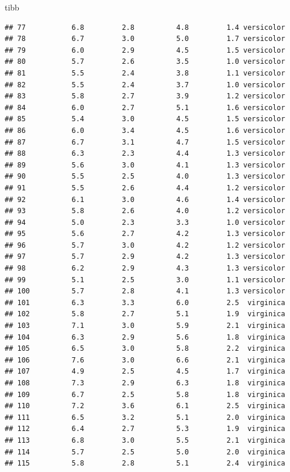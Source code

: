 \documentclass[ignorenonframetext,]{beamer}
\begin{document}
\begin{frame}[fragile]{tibb}
\begin{verbatim}
## 77           6.8         2.8          4.8         1.4 versicolor
## 78           6.7         3.0          5.0         1.7 versicolor
## 79           6.0         2.9          4.5         1.5 versicolor
## 80           5.7         2.6          3.5         1.0 versicolor
## 81           5.5         2.4          3.8         1.1 versicolor
## 82           5.5         2.4          3.7         1.0 versicolor
## 83           5.8         2.7          3.9         1.2 versicolor
## 84           6.0         2.7          5.1         1.6 versicolor
## 85           5.4         3.0          4.5         1.5 versicolor
## 86           6.0         3.4          4.5         1.6 versicolor
## 87           6.7         3.1          4.7         1.5 versicolor
## 88           6.3         2.3          4.4         1.3 versicolor
## 89           5.6         3.0          4.1         1.3 versicolor
## 90           5.5         2.5          4.0         1.3 versicolor
## 91           5.5         2.6          4.4         1.2 versicolor
## 92           6.1         3.0          4.6         1.4 versicolor
## 93           5.8         2.6          4.0         1.2 versicolor
## 94           5.0         2.3          3.3         1.0 versicolor
## 95           5.6         2.7          4.2         1.3 versicolor
## 96           5.7         3.0          4.2         1.2 versicolor
## 97           5.7         2.9          4.2         1.3 versicolor
## 98           6.2         2.9          4.3         1.3 versicolor
## 99           5.1         2.5          3.0         1.1 versicolor
## 100          5.7         2.8          4.1         1.3 versicolor
## 101          6.3         3.3          6.0         2.5  virginica
## 102          5.8         2.7          5.1         1.9  virginica
## 103          7.1         3.0          5.9         2.1  virginica
## 104          6.3         2.9          5.6         1.8  virginica
## 105          6.5         3.0          5.8         2.2  virginica
## 106          7.6         3.0          6.6         2.1  virginica
## 107          4.9         2.5          4.5         1.7  virginica
## 108          7.3         2.9          6.3         1.8  virginica
## 109          6.7         2.5          5.8         1.8  virginica
## 110          7.2         3.6          6.1         2.5  virginica
## 111          6.5         3.2          5.1         2.0  virginica
## 112          6.4         2.7          5.3         1.9  virginica
## 113          6.8         3.0          5.5         2.1  virginica
## 114          5.7         2.5          5.0         2.0  virginica
## 115          5.8         2.8          5.1         2.4  virginica

\end{verbatim}
\end{frame}
\end{document}
